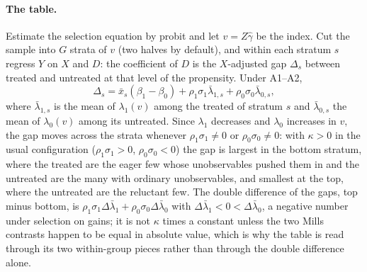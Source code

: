 \documentclass[11pt,a4paper]{article}
\theoremstyle{plain}
\theoremstyle{definition}
\theoremstyle{remark}
\newcommand{\1}{\mathbf{1}}
\begin{document}
\paragraph{The table.}
Estimate the selection equation by probit and let $v=Z\hat\gamma$ be the
index. Cut the sample into $G$ strata of $v$ (two halves by default), and
within each stratum $s$ regress $Y$ on $X$ and $D$: the coefficient of
$D$ is the $X$-adjusted gap $\Delta_s$ between treated and untreated at
that level of the propensity. Under A1--A2,
\begin{equation}\label{eq:pdid:gap}
\Delta_s=\bar x_s(\beta_1-\beta_0)+\rho_1\sigma_1\bar\lambda_{1,s}+\rho_0\sigma_0\bar\lambda_{0,s},
\end{equation}
where $\bar\lambda_{1,s}$ is the mean of $\lambda_1(v)$ among the treated
of stratum $s$ and $\bar\lambda_{0,s}$ the mean of $\lambda_0(v)$ among
its untreated. Since $\lambda_1$ decreases and $\lambda_0$ increases in
$v$, the gap moves across the strata whenever $\rho_1\sigma_1\neq0$ or
$\rho_0\sigma_0\neq0$: with $\kappa>0$ in the usual configuration
($\rho_1\sigma_1>0$, $\rho_0\sigma_0<0$) the gap is largest in the bottom
stratum, where the treated are the eager few whose unobservables pushed
them in and the untreated are the many with ordinary unobservables, and
smallest at the top, where the untreated are the reluctant few. The
double difference of the gaps, top minus bottom, is
$\rho_1\sigma_1\Delta\bar\lambda_1+\rho_0\sigma_0\Delta\bar\lambda_0$ with
$\Delta\bar\lambda_1<0<\Delta\bar\lambda_0$, a negative number under
selection on gains; it is not $\kappa$ times a constant unless the two
Mills contrasts happen to be equal in absolute value, which is why the
table is read through its two within-group pieces rather than through
the double difference alone.
\end{document}
